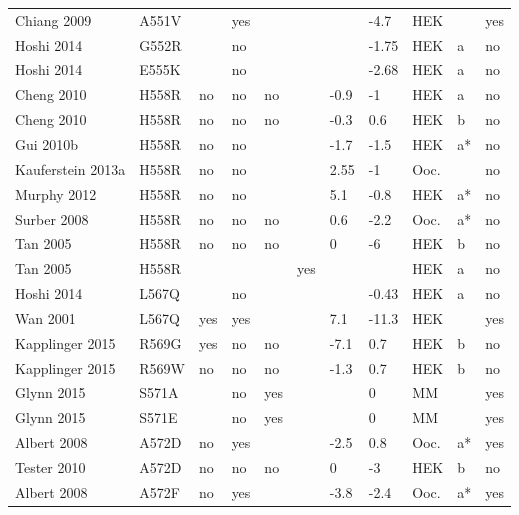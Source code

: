 \begin{tiny}
\begin{longtable}{p{4cm}|l|llll|ll|lll}
Chiang 2009\cite{Chiang2009MutationDB} & A551V &  & yes &  &  &  & -4.7 & HEK &  & yes \\
Hoshi 2014\cite{Hoshi2014MutationDB} & G552R &  & no &  &  &  & -1.75 & HEK & a & no \\
Hoshi 2014\cite{Hoshi2014MutationDB} & E555K &  & no &  &  &  & -2.68 & HEK & a & no \\
Cheng 2010\cite{Cheng2010MutationDB} & H558R & no & no & no &  & -0.9 & -1 & HEK & a & no \\
Cheng 2010\cite{Cheng2010MutationDB} & H558R & no & no & no &  & -0.3 & 0.6 & HEK & b & no \\
Gui 2010b\cite{Gui2010bMutationDB} & H558R & no & no &  &  & -1.7 & -1.5 & HEK & a* & no \\
Kauferstein 2013a\cite{Kauferstein2013aMutationDB} & H558R & no & no &  &  & 2.55 & -1 & Ooc. &  & no \\
Murphy 2012\cite{Murphy2012MutationDB} & H558R & no & no &  &  & 5.1 & -0.8 & HEK & a* & no \\
Surber 2008\cite{Surber2008MutationDB} & H558R & no & no & no &  & 0.6 & -2.2 & Ooc. & a* & no \\
Tan 2005\cite{Tan2005MutationDB} & H558R & no & no & no &  & 0 & -6 & HEK & b & no \\
Tan 2005\cite{Tan2005MutationDB} & H558R &  &  &  & yes &  &  & HEK & a & no \\
Hoshi 2014\cite{Hoshi2014MutationDB} & L567Q &  & no &  &  &  & -0.43 & HEK & a & no \\
Wan 2001\cite{Wan2001MutationDB} & L567Q & yes & yes &  &  & 7.1 & -11.3 & HEK &  & yes \\
Kapplinger 2015\cite{Kapplinger2015MutationDB} & R569G & yes & no & no &  & -7.1 & 0.7 & HEK & b & no \\
Kapplinger 2015\cite{Kapplinger2015MutationDB} & R569W & no & no & no &  & -1.3 & 0.7 & HEK & b & no \\
Glynn 2015\cite{Glynn2015MutationDB} & S571A &  & no & yes &  &  & 0 & MM &  & yes \\
Glynn 2015\cite{Glynn2015MutationDB} & S571E &  & no & yes &  &  & 0 & MM &  & yes \\
Albert 2008\cite{Albert2008MutationDB} & A572D & no & yes &  &  & -2.5 & 0.8 & Ooc. & a* & yes \\
Tester 2010\cite{Tester2010MutationDB} & A572D & no & no & no &  & 0 & -3 & HEK & b & no \\
Albert 2008\cite{Albert2008MutationDB} & A572F & no & yes &  &  & -3.8 & -2.4 & Ooc. & a* & yes \\

\end{longtable}
\end{tiny}
